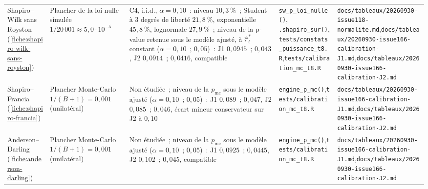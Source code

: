 \documentclass[a4paper,11pt]{article}
\newcommand{\code}[1]{\texttt{\small #1}}
\begin{document}
\begin{landscape}
\begin{center}
\begin{longtable}{@{}>{\raggedright\arraybackslash}p{2.5cm}>{\raggedright\arraybackslash}p{3.6cm}>{\raggedright\arraybackslash}p{4.0cm}>{\raggedright\arraybackslash}p{6.7cm}>{\raggedright\arraybackslash}p{7.2cm}@{}}
Shapiro--Wilk sans Royston (\ref{fiche:shapiro-wilk-sans-royston}) & Plancher de la loi nulle simulée $1/20\,001 \approx 5{,}0\cdot 10^{-5}$ & C4, i.i.d., $\alpha = 0{,}10$~: niveau $10{,}3~\%$~; Student à 3 degrés de liberté $21{,}8~\%$, exponentielle $45{,}8~\%$, lognormale $27{,}9~\%$~; niveau de la p-value retenue sous le modèle ajusté, à $\hat\pi^{*}_t$ constant ($\alpha = 0{,}10$~; $0{,}05$)~: J1 $0{,}0945$~; $0{,}043$, J2 $0{,}0914$~; $0{,}0416$, compatible & \code{sw\_p\_loi\_nulle()}, \code{.shapiro\_sur()},\newline \code{tests/constats\_puissance\_t8.R},\newline \code{tests/calibration\_mc\_t8.R} & \code{docs/tableaux/}\newline \code{20260930-issue118-normalite.md},\newline \code{docs/tableaux/}\newline \code{20260930-issue166-calibration-J1.md},\newline \code{docs/tableaux/}\newline \code{20260930-issue166-calibration-J2.md} \\
Shapiro--Francia (\ref{fiche:shapiro-francia}) & Plancher Monte-Carlo $1/(B+1) = 0{,}001$ (unilatéral) & Non étudiée~; niveau de la $p_{\mathrm{mc}}$ sous le modèle ajusté ($\alpha = 0{,}10$~; $0{,}05$)~: J1 $0{,}089$~; $0{,}047$, J2 $0{,}085$~; $0{,}046$, écart mineur conservateur sur J2 à $0{,}10$ & \code{engine\_p\_mc()},\newline \code{tests/calibration\_mc\_t8.R} & \code{docs/tableaux/}\newline \code{20260930-issue166-calibration-J1.md},\newline \code{docs/tableaux/}\newline \code{20260930-issue166-calibration-J2.md} \\
Anderson--Darling (\ref{fiche:anderson-darling}) & Plancher Monte-Carlo $1/(B+1) = 0{,}001$ (unilatéral) & Non étudiée~; niveau de la $p_{\mathrm{mc}}$ sous le modèle ajusté ($\alpha = 0{,}10$~; $0{,}05$)~: J1 $0{,}0925$~; $0{,}0445$, J2 $0{,}102$~; $0{,}045$, compatible & \code{engine\_p\_mc()},\newline \code{tests/calibration\_mc\_t8.R} & \code{docs/tableaux/}\newline \code{20260930-issue166-calibration-J1.md},\newline \code{docs/tableaux/}\newline \code{20260930-issue166-calibration-J2.md} \\

\end{longtable}
\end{center}
\end{landscape}
\end{document}
